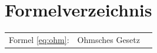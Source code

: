 {}
\chapter*{Formelverzeichnis}

\begin{tabular}{@{}lp{10cm}r}
    Formel \ref{eq:ohm}: & Ohmsches Gesetz \dotfill & \pageref{eq:ohm} \\
\end{tabular}
